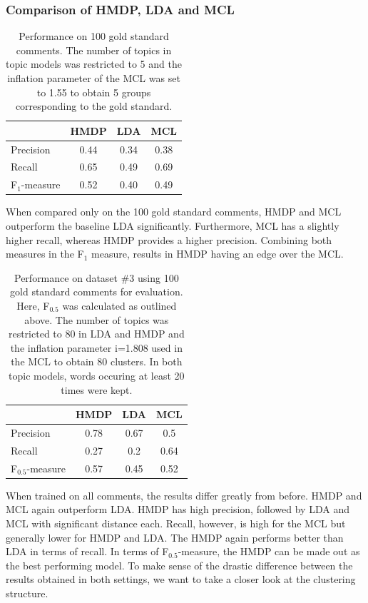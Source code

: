 \subsubsection{Comparison of HMDP, LDA and MCL}
\label{comparison}
\begin{table}[h]
\centering
\caption{Performance on 100 gold standard comments. The number of topics in topic models was restricted to 5 and the inflation parameter of the MCL was set to 1.55 to obtain 5 groups corresponding to the gold standard.}
\begin{tabular}{||l||c|c|c||}
\hline
 & HMDP & LDA & MCL \\
\hline
Precision & 0.44 & 0.34 & 0.38 \\
Recall & 0.65 & 0.49 & 0.69 \\
F$_{1}$-measure & 0.52 & 0.40 & 0.49 \\
\hline
\end{tabular}
\end{table}
When compared only on the 100 gold standard comments, HMDP and MCL outperform the baseline LDA significantly. Furthermore, MCL has a slightly higher recall, whereas HMDP provides a higher precision. Combining both measures in the F$_1$ measure, results in HMDP having an edge over the MCL.
\begin{table}[h]
\centering
\caption{Performance on dataset \#3 using 100 gold standard comments for evaluation. Here, F$_{0.5}$ was calculated as outlined above. The number of topics was restricted to 80 in LDA and HMDP and the inflation parameter i=1.808 used in the MCL to obtain 80 clusters. In both topic models, words occuring at least 20 times were kept.}
\begin{tabular}{||l||c|c|c||}
\hline
 & HMDP & LDA & MCL \\
\hline
Precision & 0.78 & 0.67 & 0.5 \\
Recall & 0.27 & 0.2 & 0.64 \\
F$_{0.5}$-measure & 0.57 & 0.45 & 0.52 \\
\hline
\end{tabular}
\end{table}
When trained on all comments, the results differ greatly from before. HMDP and MCL again outperform LDA. HMDP has high precision, followed by LDA and MCL with significant distance each. Recall, however, is high for the MCL but generally lower for HMDP and LDA. The HMDP again performs better than LDA in terms of recall. In terms of F$_{0.5}$-measure, the HMDP can be made out as the best performing model.
To make sense of the drastic difference between the results obtained in both settings, we want to take a closer look at the clustering structure.
